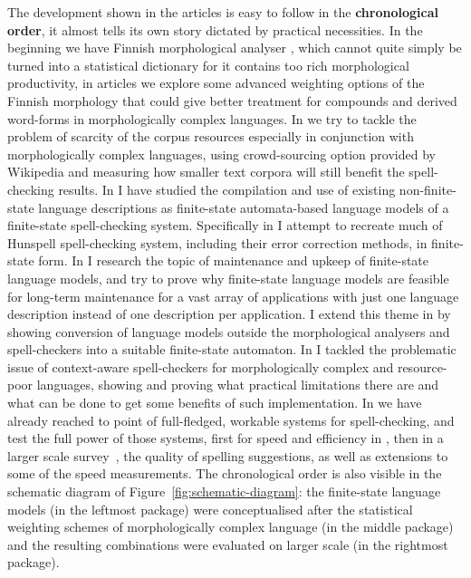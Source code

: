 \documentclass[officiallayout]{unihelcompling}
\begin{document}
The development shown in the articles is easy to follow in the
\textbf{chronological order}, it almost tells its own story dictated by
practical necessities. In the beginning we have Finnish morphological analyser
\citep{pirinen2008suomen}, which cannot quite simply be turned into a
statistical dictionary for it contains too rich morphological productivity, in
articles  we explore some
advanced weighting options of the Finnish morphology that could give better
treatment for compounds and derived word-forms in morphologically complex
languages. In  we try to tackle the problem
of scarcity of the corpus resources especially in conjunction with
morphologically complex languages, using crowd-sourcing option provided by
Wikipedia and measuring how smaller text corpora will still benefit the
spell-checking results. In 
I have studied the compilation and use of existing non-finite-state language
descriptions as finite-state automata-based language models of a finite-state
spell-checking system.  Specifically in  I
attempt to recreate much of Hunspell spell-checking system, including their
error correction methods, in finite-state form. In
 I research the topic of maintenance and
upkeep of finite-state language models, and try to prove why finite-state
language models are feasible for long-term maintenance for a vast array of
applications with just one language description instead of one description per
application.  I extend this theme in  by
showing conversion of language models outside the morphological analysers and
spell-checkers into a suitable finite-state automaton. In
 I tackled the problematic issue of
context-aware spell-checkers for morphologically complex and resource-poor
languages, showing and proving what practical limitations there are and what
can be done to get some benefits of such implementation. In
 we have already reached to
point of full-fledged, workable systems for spell-checking, and test the full
power of those systems, first for speed and efficiency in
, then in a larger scale
survey~, the quality of spelling suggestions, as
well as extensions to some of the speed measurements.
The chronological order is also visible in the schematic diagram of
Figure~\ref{fig:schematic-diagram}: the finite-state language models (in the
leftmost package) were conceptualised after the statistical weighting schemes
of morphologically complex language (in the middle package) and the resulting
combinations were evaluated on larger scale (in the rightmost package).
\end{document}
